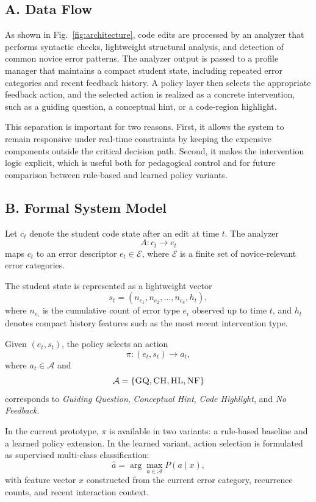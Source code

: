 \documentclass[conference]{IEEEtran}
\begin{document}
\subsection*{A. Data Flow}

As shown in Fig.~\ref{fig:architecture}, code edits are processed by an analyzer that performs syntactic checks, lightweight structural analysis, and detection of common novice error patterns. The analyzer output is passed to a profile manager that maintains a compact student state, including repeated error categories and recent feedback history. A policy layer then selects the appropriate feedback action, and the selected action is realized as a concrete intervention, such as a guiding question, a conceptual hint, or a code-region highlight.

This separation is important for two reasons. First, it allows the system to remain responsive under real-time constraints by keeping the expensive components outside the critical decision path. Second, it makes the intervention logic explicit, which is useful both for pedagogical control and for future comparison between rule-based and learned policy variants.

\subsection*{B. Formal System Model}

Let $c_t$ denote the student code state after an edit at time $t$. The analyzer
\[
A: c_t \rightarrow e_t
\]
maps $c_t$ to an error descriptor $e_t \in \mathcal{E}$, where $\mathcal{E}$ is a finite set of novice-relevant error categories.

The student state is represented as a lightweight vector
\[
s_t = (n_{e_1}, n_{e_2}, \dots, n_{e_k}, h_t),
\]
where $n_{e_i}$ is the cumulative count of error type $e_i$ observed up to time $t$, and $h_t$ denotes compact history features such as the most recent intervention type.

Given $(e_t, s_t)$, the policy selects an action
\[
\pi: (e_t, s_t) \rightarrow a_t,
\]
where $a_t \in \mathcal{A}$ and
\[
\mathcal{A}=\{\textsc{GQ}, \textsc{CH}, \textsc{HL}, \textsc{NF}\}
\]
corresponds to \emph{Guiding Question}, \emph{Conceptual Hint}, \emph{Code Highlight}, and \emph{No Feedback}.

In the current prototype, $\pi$ is available in two variants: a rule-based baseline and a learned policy extension. In the learned variant, action selection is formulated as supervised multi-class classification:
\[
\hat{a} = \arg\max_{a \in \mathcal{A}} P(a \mid x),
\]
with feature vector $x$ constructed from the current error category, recurrence counts, and recent interaction context.
\end{document}
